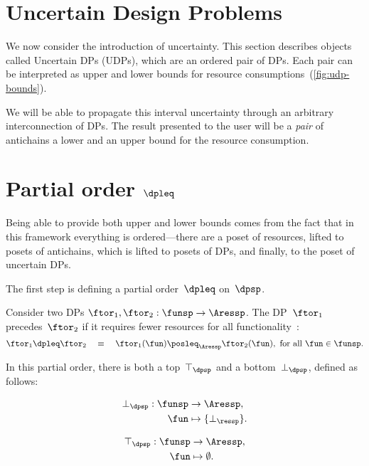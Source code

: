 \section{Uncertain Design Problems}
\label{sec:UDP}

We now consider the introduction of uncertainty. This section describes
objects called Uncertain DPs (UDPs), which are an ordered pair of
DPs. Each pair can be interpreted as upper and lower bounds for resource
consumptions~(\cref{fig:udp-bounds}).


We will be able to propagate this interval uncertainty through an
arbitrary interconnection of DPs. The result presented to the user
will be a \emph{pair} of antichains \textemdash{} a lower and an upper
bound for the resource consumption.


\section{Partial order $\dpleq$}

Being able to provide both upper and lower bounds comes from the fact
that in this framework everything is ordered---there are
a poset of resources, lifted to posets of antichains, which is lifted
to posets of DPs, and finally, to the poset of uncertain DPs.

The first step is defining a partial order~$\dpleq$ on~$\dpsp$.
\begin{definition}
  Consider two DPs $\ftor_{1},\ftor_{2}:\funsp\rightarrow\Aressp$.
  The DP~$\ftor_{1}$ precedes~$\ftor_{2}$ if it requires fewer resources
  for all functionality~\fun:
  \[
    \ftor_{1}\dpleq\ftor_{2}\quad\equiv\quad\ftor_{1}(\fun)\posleq_{\Aressp}\ftor_{2}(\fun),\ \text{for all }\fun\in\funsp.
  \]
\end{definition}

In this partial order, there is both a top~$\top_{\dpsp}$ and a
bottom~$\bot_{\dpsp}$, defined as follows:

\vspace{-5mm}

\begin{minipage}[t]{0.4\columnwidth}
  \begin{align*}
    \bot_{\dpsp}:\funsp & \rightarrow\Aressp,\\
    \fun & \mapsto\{\bot_{\ressp}\}.
  \end{align*}

\end{minipage}
\begin{minipage}[t]{0.4\columnwidth}
  \begin{align}
    \top_{\dpsp}:\funsp & \rightarrow\Aressp,\nonumber \\
    \fun & \mapsto\emptyset.\label{eq:top}
  \end{align}

\end{minipage}


